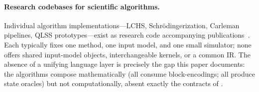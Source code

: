 \paragraph{Research codebases for scientific algorithms.}
Individual algorithm implementations---LCHS, Schr\"odingerization, Carleman
pipelines, QLSS prototypes---exist as research code accompanying
publications~\cite{an2026lchs,jin2024schrodingerization,liu2021pnas,
liu2023carleman,an2026lchs}.  Each typically fixes one method, one input model, and one
small simulator; none offers shared input-model objects, interchangeable
kernels, or a common IR.  The absence of a unifying language layer is
precisely the gap this paper documents: the algorithms compose
mathematically (all consume block-encodings; all produce state oracles) but
not computationally, absent exactly the contracts of
.

